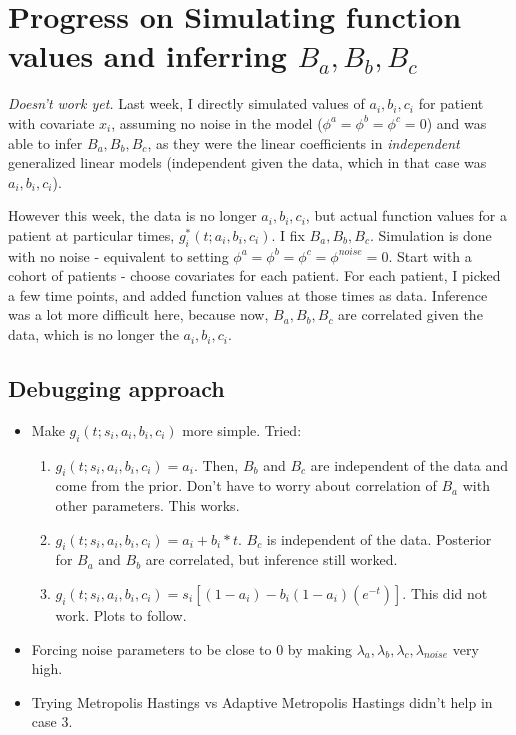 \section*{Progress on Simulating function values and inferring $B_a, B_b, B_c$}

\emph{Doesn't work yet.}  Last week, I directly simulated values of $a_i, b_i, c_i$ for patient with covariate $x_i$, assuming no noise in the model ($\phi^a=\phi^b=\phi^c=0$) and was able to infer $B_a, B_b, B_c$, as they were the linear coefficients in \emph{independent} generalized linear models (independent given the data, which in that case was $a_i, b_i, c_i$).

However this week, the data is no longer $a_i, b_i, c_i$, but actual function values for a patient at particular times, $g_i^*(t; a_i, b_i, c_i)$.  I fix $B_a, B_b, B_c$.  Simulation is done with no noise - equivalent to setting $\phi^a=\phi^b=\phi^c=\phi^{noise}=0$.  Start with a cohort of patients - choose covariates for each patient.  For each patient, I picked a few time points, and added function values at those times as data.   Inference was a lot more difficult here, because now, $B_a, B_b, B_c$ are correlated given the data, which is no longer the $a_i, b_i, c_i$.

\subsection*{Debugging approach}
\begin{itemize}
\item Make $g_i(t;s_i, a_i, b_i, c_i)$ more simple.  Tried:
  \begin{enumerate}
    \item $g_i(t;s_i, a_i, b_i, c_i) = a_i$.  Then, $B_b$ and $B_c$ are independent of the data and come from the prior.  Don't have to worry about correlation of $B_a$ with other parameters.  This works.
    \item $g_i(t;s_i, a_i, b_i, c_i) = a_i + b_i*t$.  $B_c$ is independent of the data.  Posterior for $B_a$ and $B_b$ are correlated, but inference still worked.
    \item $g_i(t;s_i, a_i, b_i, c_i) = s_i[(1-a_i) - b_i(1-a_i)(e^{-t})]$.  This did not work.  Plots to follow.
  \end{enumerate}
\item Forcing noise parameters to be close to 0 by making $\lambda_a, \lambda_b, \lambda_c, \lambda_{noise}$ very high.
\item Trying Metropolis Hastings vs Adaptive Metropolis Hastings didn't help in case 3.
\end{itemize}

